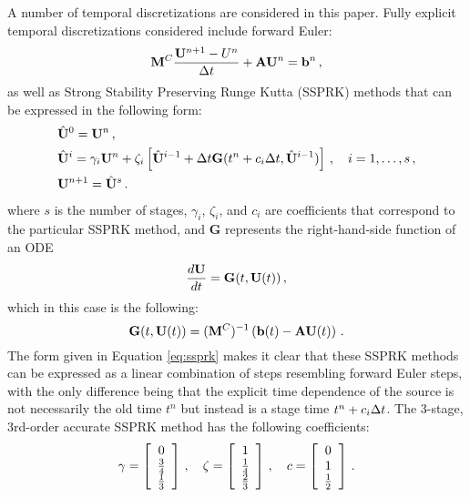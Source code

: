 A number of temporal discretizations are considered in this paper.
Fully explicit temporal discretizations considered include forward Euler:
\begin{equation}
  \mathbf{M}^C\frac{\mathbf{U}^{n+1}-U^n}{\Delta t} + \mathbf{A}\mathbf{U}^n = \mathbf{b}^n \,,
\end{equation}
as well as Strong Stability Preserving Runge Kutta (SSPRK) methods that
can be expressed in the following form:
\begin{subequations}\label{eq:ssprk}
\begin{align}
  & \hat{\mathbf{U}}^0 = \mathbf{U}^n \,, \\
  & \hat{\mathbf{U}}^i = \gamma_i \mathbf{U}^n + \zeta_i \left[
      \hat{\mathbf{U}}^{i-1}
      + \Delta t\mathbf{G}(t^n+c_i\Delta t, \hat{\mathbf{U}}^{i-1})\right]
    \,, \quad
    i = 1,\ldots,s
    \,, \\
  & \mathbf{U}^{n+1} = \hat{\mathbf{U}}^s \,.
\end{align}
\end{subequations}
where $s$ is the number of stages, $\gamma_i$, $\zeta_i$, and $c_i$ are
coefficients that correspond to the particular SSPRK method, and
$\mathbf{G}$ represents the right-hand-side function of an ODE
\begin{equation}
  \frac{d\mathbf{U}}{dt} = \mathbf{G}(t,\mathbf{U}(t)) \,,
\end{equation}
which in this case is the following:
\begin{equation}
  \mathbf{G}(t,\mathbf{U}(t)) = (\mathbf{M}^C)^{-1}
    \left(\mathbf{b}(t) - \mathbf{A}\mathbf{U}(t)\right) \,.
\end{equation}
The form given in Equation \eqref{eq:ssprk} makes it clear that these
SSPRK methods can be expressed as a linear combination of steps resembling
forward Euler steps, with the only difference being that the explicit
time dependence of the source is not necessarily the old time $t^n$ but
instead is a stage time $t^n + c_i\Delta t$. The 3-stage, 3rd-order accurate SSPRK
method has the following coefficients:
\begin{equation}
  \gamma = \left[\begin{array}{c}
    0\\\frac{3}{4}\\\frac{1}{3}\end{array}\right]
  \,, \quad
  \zeta = \left[\begin{array}{c}
    1\\\frac{1}{4}\\\frac{2}{3}\end{array}\right]
  \,, \quad
  c = \left[\begin{array}{c}0\\1\\\frac{1}{2}\end{array}\right] \,.
\end{equation}
